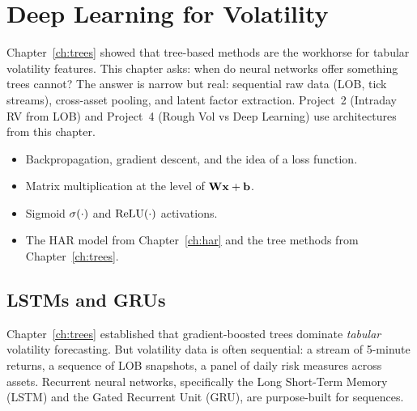 
\chapter{Deep Learning for Volatility}\label{ch:deeplearning}

\begin{application}
Chapter~\ref{ch:trees} showed that tree-based methods are the workhorse for tabular volatility features.
This chapter asks: when do neural networks offer something trees cannot?
The answer is narrow but real: sequential raw data (LOB, tick streams), cross-asset pooling, and latent factor extraction.
Project~2 (Intraday RV from LOB) and Project~4 (Rough Vol vs Deep Learning) use architectures from this chapter.
\end{application}

\begin{prereq}
\begin{itemize}[nosep]
  \item Backpropagation, gradient descent, and the idea of a loss function.
  \item Matrix multiplication at the level of $\mathbf{W} \mathbf{x} + \mathbf{b}$.
  \item Sigmoid $\sigma(\cdot)$ and $\operatorname{ReLU}(\cdot)$ activations.
  \item The HAR model from Chapter~\ref{ch:har} and the tree methods from Chapter~\ref{ch:trees}.
\end{itemize}
\end{prereq}

\section{LSTMs and GRUs}\label{sec:dl:lstm}

Chapter~\ref{ch:trees} established that gradient-boosted trees dominate \emph{tabular} volatility forecasting.
But volatility data is often sequential: a stream of 5-minute returns, a sequence of LOB snapshots, a panel of daily risk measures across assets.
Recurrent neural networks, specifically the Long Short-Term Memory (LSTM) and the Gated Recurrent Unit (GRU), are purpose-built for sequences.

